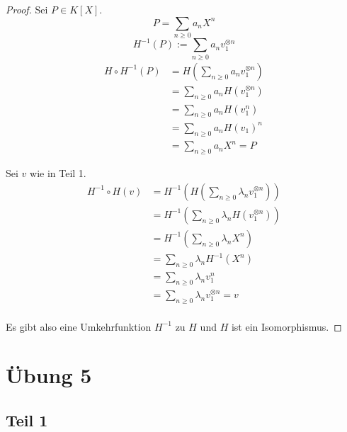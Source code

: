 \documentclass[10pt,a4paper]{article}
\begin{document}
\begin{proof}
Sei $P \in K[X]$.
\begin{equation}
P = \sum_{n \ge 0} a_{n} X^{n}
\end{equation}
\begin{equation}
H^{-1}(P) := \sum_{n \ge 0} a_{n} v_{1}^{\otimes n}
\end{equation}
\begin{align*}
H \circ H^{-1}(P) & = H(\sum_{n \ge 0} a_{n} v_{1}^{\otimes n})\\
& = \sum_{n \ge 0} a_{n} H(v_{1}^{\otimes n})\\
& = \sum_{n \ge 0} a_{n} H(v_{1}^{n})\\
& = \sum_{n \ge 0} a_{n} H(v_{1})^{n}\\
& = \sum_{n \ge 0} a_{n} X^{n} = P
\end{align*}

Sei $v$ wie in Teil 1.
\begin{align*}
H^{-1} \circ H(v) & = H^{-1}(H(\sum_{n \ge 0} \lambda_{n} v_{1}^{\otimes n}))\\
& = H^{-1}(\sum_{n \ge 0} \lambda_{n} H(v_{1}^{\otimes n}))\\
& = H^{-1}(\sum_{n \ge 0} \lambda_{n} X^{n})\\
& = \sum_{n \ge 0} \lambda_{n} H^{-1}(X^{n})\\
& = \sum_{n \ge 0} \lambda_{n} v_{1}^{n}\\
& = \sum_{n \ge 0} \lambda_{n} v_{1}^{\otimes n} = v\\
\end{align*}

Es gibt also eine Umkehrfunktion $H^{-1}$ zu $H$ und $H$ ist ein Isomorphismus.
\end{proof}

\section*{Übung 5}

\subsection*{Teil 1}
\end{document}
